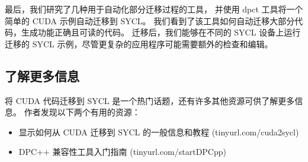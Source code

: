 最后，我们研究了几种用于自动化部分迁移过程的工具，
并使用 dpct 工具将一个简单的 CUDA 示例自动迁移到 SYCL。 
我们看到了该工具如何自动迁移大部分代码，生成功能正确且可读的代码。 
迁移后，我们能够在不同的 SYCL 设备上运行迁移的 SYCL 示例，尽管更复杂的应用程序可能需要额外的检查和编辑。

\subsection{了解更多信息}
将 CUDA 代码迁移到 SYCL 是一个热门话题，还有许多其他资源可供了解更多信息。 作者发现以下两个有用的资源：

\begin{itemize}
	\item 显示如何从 CUDA 迁移到 SYCL 的一般信息和教程 (tinyurl.com/cuda2sycl)

	\item DPC++ 兼容性工具入门指南 (tinyurl.com/startDPCpp)
\end{itemize}